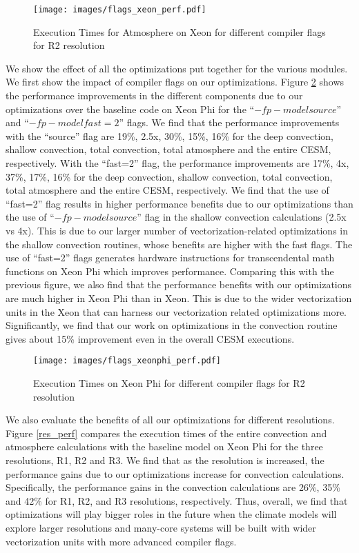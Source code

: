\begin {figure}
\centering
\texttt{[image: images/flags\_xeon\_perf.pdf]}
\caption{Execution Times for Atmosphere on Xeon for different compiler flags for R2 resolution}
\label{flags_xeon_perf}
\end{figure}

We show the effect of all the optimizations put together for the various modules. We first show the impact of compiler flags on our optimizations.
Figure \ref{flags_xeonphi_perf} shows the performance improvements in the different components due to our optimizations over the baseline code on Xeon Phi for the ``$-fp-model source$'' and ``$-fp-model fast=2$'' flags. We find that the performance improvements with the ``source'' flag are 19\%, 2.5x, 30\%, 15\%, 16\% for the deep convection, shallow convection, total convection, total atmosphere and the entire CESM, respectively. With the ``fast=2'' flag, the performance improvements are  17\%, 4x, 37\%, 17\%, 16\% for the deep convection, shallow convection, total convection, total atmosphere and the entire CESM, respectively. We find that the use of ``fast=2'' flag results in higher performance benefits due to our optimizations than the use of ``$-fp-model source$'' flag in the shallow convection calculations (2.5x vs 4x). This is due to our larger number of vectorization-related optimizations in the shallow convection routines, whose benefits are higher with the fast flags. The use of ``fast=2'' flags generates hardware instructions for transcendental math functions on Xeon Phi which improves performance.
Comparing this with the previous figure, we also find that
 the performance benefits with our optimizations are much higher in Xeon Phi than in Xeon. This is due to the wider vectorization units in the Xeon that can harness our vectorization related optimizations more. Significantly, we find that our work on optimizations in the convection routine gives about 15\% improvement even in the overall CESM executions.

\begin {figure}
\centering
\texttt{[image: images/flags\_xeonphi\_perf.pdf]}
\caption{Execution Times on Xeon Phi for different compiler flags for R2 resolution}
\label{flags_xeonphi_perf}
\end{figure}

We also evaluate the benefits of all our optimizations for different resolutions. Figure \ref{res_perf} compares the execution times of the entire convection and atmosphere calculations with the baseline model on Xeon Phi for the three resolutions, R1, R2 and R3. We find that as the resolution is increased, the performance gains due to our optimizations increase for convection calculations. Specifically, the performance gains in the convection calculations are 26\%, 35\% and 42\% for R1, R2, and R3 resolutions, respectively. Thus, overall, we find that optimizations will play bigger roles in the future when the climate models will explore larger resolutions and many-core systems will be built with wider vectorization units with more advanced compiler flags.

